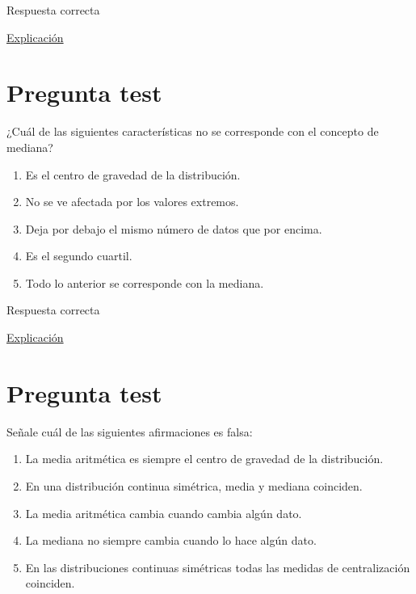 \documentclass[
]{book}
\providecommand{\tightlist}{%
  \setlength{\itemsep}{0pt}\setlength{\parskip}{0pt}}
\begin{document}
Respuesta correcta

\href{https://1fjmanzano.github.io/bioestadistica/medidas-de-posicio\%CC\%81n-dispersio\%CC\%81n-y-forma.html}{Explicación}

\hypertarget{pregunta-test-65}{%
\section{Pregunta test}\label{pregunta-test-65}}

¿Cuál de las siguientes características no se corresponde con el concepto de mediana?

\begin{enumerate}
\def\labelenumi{\alph{enumi})}
\tightlist
\item
  Es el centro de gravedad de la distribución.
\item
  No se ve afectada por los valores extremos.
\item
  Deja por debajo el mismo número de datos que por encima.
\item
  Es el segundo cuartil.
\item
  Todo lo anterior se corresponde con la mediana.
\end{enumerate}

Respuesta correcta

\href{https://1fjmanzano.github.io/bioestadistica/medidas-de-posicio\%CC\%81n-dispersio\%CC\%81n-y-forma.html\#medidas-de-posicio\%CC\%81n-centrales}{Explicación}

\hypertarget{pregunta-test-66}{%
\section{Pregunta test}\label{pregunta-test-66}}

Señale cuál de las siguientes afirmaciones es falsa:

\begin{enumerate}
\def\labelenumi{\alph{enumi})}
\tightlist
\item
  La media aritmética es siempre el centro de gravedad de la distribución.
\item
  En una distribución continua simétrica, media y mediana coinciden.
\item
  La media aritmética cambia cuando cambia algún dato.
\item
  La mediana no siempre cambia cuando lo hace algún dato.
\item
  En las distribuciones continuas simétricas todas las medidas de centralización coinciden.
\end{enumerate}
\end{document}
